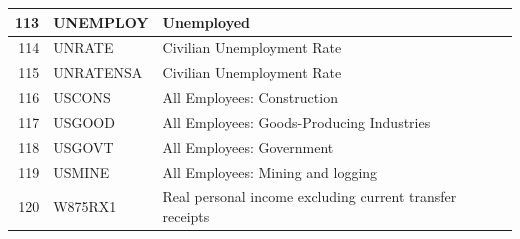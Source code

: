 \documentclass[12pt]{article}
\begin{document}
\begin{table}[ht]
\begin{tabular}{r|p{4cm}p{11cm}}
	\hline
	113 & UNEMPLOY & Unemployed \\ 
	\hline
	114 & UNRATE & Civilian Unemployment Rate \\ 
	\hline
	115 & UNRATENSA & Civilian Unemployment Rate \\ 
	\hline
	116 & USCONS & All Employees: Construction \\ 
	\hline
	117 & USGOOD & All Employees: Goods-Producing Industries \\ 
	\hline
	118 & USGOVT & All Employees: Government \\ 
	\hline
	119 & USMINE & All Employees: Mining and logging \\ 
	\hline
	120 & W875RX1 & Real personal income excluding current transfer receipts \\ 
	\hline
	\hline
\end{tabular}
\end{table}
\end{document}
